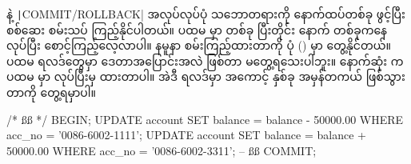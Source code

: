  နဲ့ \texttt|COMMIT/ROLLBACK| အလုပ်လုပ်ပုံ သဘောတရားကို  နောက်ထပ်တစ်ခု ဖွင့်ပြီး စစ်ဆေး စမ်းသပ် ကြည့်နိုင်ပါတယ်။ ပထမ  မှာ  တစ်ခု  ပြီးတိုင်း နောက်  တစ်ခုကနေ  လုပ်ပြီး စောင့်ကြည့်လေ့လာပါ။ နမူနာ စမ်းကြည့်ထားတာကို ပုံ (\fRefNo{\ref{fig:txchk}}) မှာ တွေ့နိုင်တယ်။ ပထမ  ရလဒ်တွေမှာ ဒေတာအပြောင်းအလဲ ဖြစ်တာ မတွေ့ရသေးပါဘူး။ နောက်ဆုံး  က ပထမ  မှာ  လုပ်ပြီးမှ  ထားတာပါ။ အဲဒီ ရလဒ်မှာ အကောင့်  နှစ်ခု အမှန်တကယ်  ဖြစ်သွားတာကို တွေ့ရမှာပါ။ 

%
\begin{sql}
/* ßß */
BEGIN;
UPDATE account SET balance = balance - 50000.00 
    WHERE acc_no = '0086-6002-1111';
UPDATE account SET balance = balance + 50000.00 
    WHERE acc_no = '0086-6002-3311';
-- ßß
COMMIT;
\end{sql}
%

\begin{figure}[tbh!]
\caption{} 
\label{fig:tx}
\end{figure}


\begin{figure}[tbh!]
\caption{} 
\label{fig:txchk}
\end{figure}

